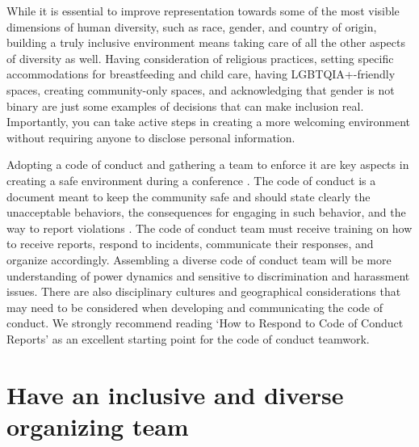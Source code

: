 \documentclass[10pt,letterpaper]{article}
\begin{document}
While it is essential to improve representation towards some of the most visible dimensions of human diversity, such as race, gender, and country of origin, building a truly inclusive environment means taking care of all the other aspects of diversity as well. 
Having consideration of religious practices, setting specific accommodations for breastfeeding and child care, having LGBTQIA+-friendly spaces, creating community-only spaces, and acknowledging that gender is not binary are just some examples of decisions that can make inclusion real.
Importantly, you can take active steps in creating a more welcoming environment without requiring anyone to disclose personal information.

Adopting a code of conduct and gathering a team to enforce it are key aspects in creating a safe environment during a conference \cite{favaroYourScienceConference2016}.
The code of conduct is a document meant to keep the community safe and should state clearly the unacceptable behaviors, the consequences for engaging in such behavior, and the way to report violations \cite{auroraHowRespondCode2019}. 
The code of conduct team must receive training on how to receive reports, respond to incidents, communicate their responses, and organize accordingly. 
Assembling a diverse code of conduct team will be more understanding of power dynamics and sensitive to discrimination and harassment issues. 
There are also disciplinary cultures and geographical considerations that may need to be considered when developing and communicating the code of conduct. 
We strongly recommend reading `How to Respond to Code of Conduct Reports' \cite{auroraHowRespondCode2019} as an excellent starting point for the code of conduct teamwork.


\section{Have an inclusive and diverse organizing team}
\label{rule_organizing_team}
\end{document}
